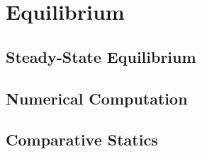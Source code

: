 \section{Equilibrium}
\subsection{Steady-State Equilibrium}
\subsection{Numerical Computation}
\subsection{Comparative Statics} 